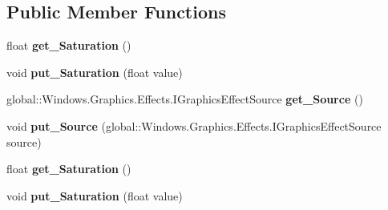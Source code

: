 \subsection*{Public Member Functions}
\begin{DoxyCompactItemize}
\item 
\mbox{\label{interface_microsoft_1_1_graphics_1_1_canvas_1_1_effects_1_1_i_saturation_effect_adecdc3257dffa4b9d889b825dee8bcfc}} 
float {\bfseries get\+\_\+\+Saturation} ()
\item 
\mbox{\label{interface_microsoft_1_1_graphics_1_1_canvas_1_1_effects_1_1_i_saturation_effect_a336f2121ed8c5134bdfb2dfbff7e6dc5}} 
void {\bfseries put\+\_\+\+Saturation} (float value)
\item 
\mbox{\label{interface_microsoft_1_1_graphics_1_1_canvas_1_1_effects_1_1_i_saturation_effect_a6d046df767aa40e632f84f8898bab4ee}} 
global\+::\+Windows.\+Graphics.\+Effects.\+I\+Graphics\+Effect\+Source {\bfseries get\+\_\+\+Source} ()
\item 
\mbox{\label{interface_microsoft_1_1_graphics_1_1_canvas_1_1_effects_1_1_i_saturation_effect_abeab04d73cf460ffaf84e878855471bd}} 
void {\bfseries put\+\_\+\+Source} (global\+::\+Windows.\+Graphics.\+Effects.\+I\+Graphics\+Effect\+Source source)
\item 
\mbox{\label{interface_microsoft_1_1_graphics_1_1_canvas_1_1_effects_1_1_i_saturation_effect_adecdc3257dffa4b9d889b825dee8bcfc}} 
float {\bfseries get\+\_\+\+Saturation} ()
\item 
\mbox{\label{interface_microsoft_1_1_graphics_1_1_canvas_1_1_effects_1_1_i_saturation_effect_a336f2121ed8c5134bdfb2dfbff7e6dc5}} 
void {\bfseries put\+\_\+\+Saturation} (float value)
\item 
\mbox{\label{interface_microsoft_1_1_graphics_1_1_canvas_1_1_effects_1_1_i_saturation_effect_a6d046df767aa40e632f84f8898bab4ee}} 

\end{DoxyCompactItemize}
